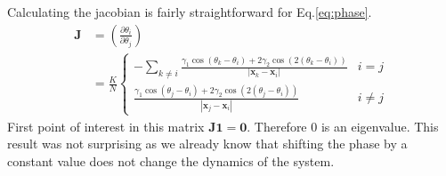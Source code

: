 \documentclass[superscriptaddress,reprint,amssymb, amsmath,aps, pre]{revtex4-1}
\begin{document}
{{        Calculating the jacobian is fairly straightforward for Eq.\ref{eq:phase}. 
        \begin{align}
            \mathbf{J} &= \left(\frac{\partial \theta_i}{\partial \theta_j}\right) \nonumber \\
            &= \frac{K}{N}\begin{cases}
                -\sum_{k \neq i} \frac{\gamma_1 \cos\left(\theta_{k}-\theta_{i}\right) + 2 \gamma_2 \cos \left(2 \left(\theta_k -\theta_i\right)\right) }{\left|\mathbf{x}_{k}-\mathbf{x}_{i}\right|} & i = j  \\
                \frac{\gamma_1 \cos\left(\theta_{j}-\theta_{i}\right) + 2 \gamma_2 \cos \left(2 \left(\theta_j -\theta_i\right)\right) }{\left|\mathbf{x}_{j}-\mathbf{x}_{i}\right|} & i \neq j
            \end{cases}
        \end{align}
        First point of interest in this matrix \(\mathbf{J} \mathbf{1} = \mathbf{0}\). Therefore \(0\) is an eigenvalue. This result was not surprising as we already know that shifting the phase by a constant value does not change the dynamics of the system.  

}}
\end{document}
